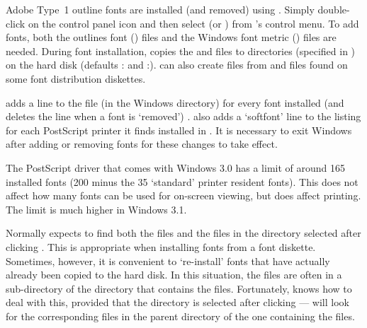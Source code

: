 Adobe Type~1 outline fonts are installed (and removed) using {\ATM}.
Simply double-click on the {\ATM} control panel icon and 
then select  (or ) from {\ATM}'s control menu.
To add fonts, both the outlines font ({\PFB}) files and 
the Windows font metric ({\PFM}) files are needed.
During font installation, {\ATM} copies the {\PFB} and {\PFM} files to 
directories (specified in {\ATMINI}) on the hard disk 
(defaults {\lavender\verb@c:\psfonts@\revert} and 
\lavender\verb@c:\psfonts\pfm@\revert).
{\ATM} can also create {\PFM} files from {\AFM} and {\INF} files found 
on some font distribution diskettes.

{\ATM} adds a line to the file {\ATMINI} 
(in the Windows directory) 
for every font installed (and deletes the line when a font is `removed')%
.
{\ATM} also adds a `softfont' line to the listing for each 
Post\-Script printer it finds installed in {\WININI}.
%
It is necessary to exit Windows after adding or removing
fonts for these changes to take effect.


The PostScript driver that comes with Windows 3.0
has a limit of around 165 installed fonts 
(200 minus the 35 `standard' printer resident fonts).
This does not affect how many fonts can be used for on-screen viewing,
but does affect printing.
The limit is much higher in Windows 3.1.




Normally {\ATM} expects to find both the {\PFB} files and the {\PFM}
files in the directory selected after clicking .  This is
appropriate when installing fonts from a font diskette. %
Sometimes, however, it is convenient to `re-install' fonts that have actually
already been copied to the hard disk.  In this situation, the {\PFM}
files are often in a sub-directory of the directory that contains the
{\PFB} files. Fortunately, {\ATM} knows how to deal with this, provided
that the {\PFM} directory is selected after clicking  --- 
{\ATM} will look for the corresponding {\PFB} files in the parent directory
of the one containing the {\PFM} files.

